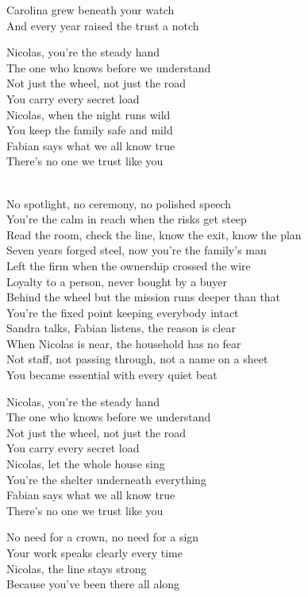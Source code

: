 \begin{lyrics}
Carolina grew beneath your watch\\
And every year raised the trust a notch

Nicolas, you’re the steady hand\\
The one who knows before we understand\\
Not just the wheel, not just the road\\
You carry every secret load\\
Nicolas, when the night runs wild\\
You keep the family safe and mild\\
Fabian says what we all know true\\
There’s no one we trust like you

\\
No spotlight, no ceremony, no polished speech\\
You’re the calm in reach when the risks get steep\\
Read the room, check the line, know the exit, know the plan\\
Seven years forged steel, now you’re the family’s man\\
Left the firm when the ownership crossed the wire\\
Loyalty to a person, never bought by a buyer\\
Behind the wheel but the mission runs deeper than that\\
You’re the fixed point keeping everybody intact\\
Sandra talks, Fabian listens, the reason is clear\\
When Nicolas is near, the household has no fear\\
Not staff, not passing through, not a name on a sheet\\
You became essential with every quiet beat

Nicolas, you’re the steady hand\\
The one who knows before we understand\\
Not just the wheel, not just the road\\
You carry every secret load\\
Nicolas, let the whole house sing\\
You’re the shelter underneath everything\\
Fabian says what we all know true\\
There’s no one we trust like you

No need for a crown, no need for a sign\\
Your work speaks clearly every time\\
Nicolas, the line stays strong\\
Because you’ve been there all along
\end{lyrics}


